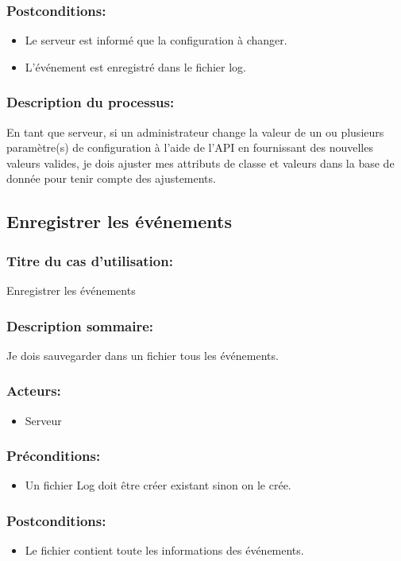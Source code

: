 \documentclass{scrreprt}
\begin{document}
\subsubsection{Postconditions:}
\begin{itemize}
    \item  Le serveur est informé que la configuration à changer.
    \item  L'événement est enregistré dans le fichier log.
\end{itemize} 
\subsubsection{Description du processus:}En tant que serveur, si un administrateur change la valeur de un ou plusieurs paramètre(s)
de configuration à l'aide de l'API en fournissant des nouvelles valeurs valides,
je dois ajuster mes attributs de classe et valeurs dans la base de donnée
pour tenir compte des ajustements.

\subsection{Enregistrer les événements}
\subsubsection{Titre du cas d'utilisation:} Enregistrer les événements
\subsubsection{Description sommaire:}Je dois sauvegarder dans un fichier tous les événements.
\subsubsection{Acteurs:}
\begin{itemize}
    \item Serveur
\end{itemize}
\subsubsection{Préconditions:}
\begin{itemize}
    \item  Un fichier Log doit être créer existant sinon on le crée.
\end{itemize} 
\subsubsection{Postconditions:}
\begin{itemize}
    \item  Le fichier contient toute les informations des événements.
\end{itemize} 
\end{document}
